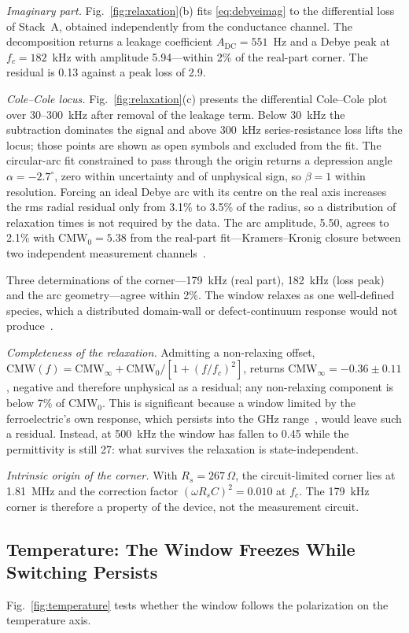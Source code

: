 \documentclass[journal]{IEEEtran}
\newcommand{\CMW}{\mathrm{CMW}}
\newcommand{\fc}{f_{c}}
\begin{document}
\textit{Imaginary part.} Fig.~\ref{fig:relaxation}(b) fits
\eqref{eq:debyeimag} to the differential loss of Stack~A, obtained
independently from the conductance channel. The decomposition returns a
leakage coefficient $A_{\mathrm{DC}} = 551$~Hz and a Debye peak at
$\fc = 182$~kHz with amplitude 5.94---within 2\% of the real-part corner. The
residual is 0.13 against a peak loss of 2.9.

\textit{Cole--Cole locus.} Fig.~\ref{fig:relaxation}(c) presents the
differential Cole--Cole plot over 30--300~kHz after removal of the leakage
term. Below 30~kHz the subtraction dominates the signal and above 300~kHz
series-resistance loss lifts the locus; those points are shown as open
symbols and excluded from the fit. The circular-arc fit constrained to pass
through the origin returns a depression angle $\alpha = -2.7^\circ$, zero
within uncertainty and of unphysical sign, so $\beta = 1$ within resolution.
Forcing an ideal Debye arc with its centre on the real axis increases the rms
radial residual only from 3.1\% to 3.5\% of the radius, so a distribution of
relaxation times is not required by the data. The arc amplitude, 5.50, agrees
to 2.1\% with $\CMW_0 = 5.38$ from the real-part fit---Kramers--Kronig
closure between two independent measurement channels~\cite{colecole1941}.

Three determinations of the corner---179~kHz (real part), 182~kHz (loss peak)
and the arc geometry---agree within 2\%. The window relaxes as one
well-defined species, which a distributed domain-wall or defect-continuum
response would not produce~\cite{jonscher1977,jonscher1983}.

\textit{Completeness of the relaxation.} Admitting a non-relaxing offset,
$\CMW(f) = \CMW_\infty + \CMW_0/[1+(f/\fc)^2]$, returns
$\CMW_\infty = -0.36 \pm 0.11$, negative and therefore unphysical as a
residual; any non-relaxing component is below 7\% of $\CMW_0$. This is
significant because a window limited by the ferroelectric's own response,
which persists into the GHz range~\cite{kim2023impedance}, would leave such a
residual. Instead, at 500~kHz the window has fallen to 0.45 while the
permittivity is still 27: what survives the relaxation is state-independent.

\textit{Intrinsic origin of the corner.} With $R_s = 267\,\Omega$, the
circuit-limited corner lies at 1.81~MHz and the correction factor
$(\omega R_s C)^2 = 0.010$ at $\fc$. The 179~kHz corner is therefore a
property of the device, not the measurement circuit.

\subsection{Temperature: The Window Freezes While Switching Persists}
Fig.~\ref{fig:temperature} tests whether the window follows the polarization
on the temperature axis.
\end{document}
